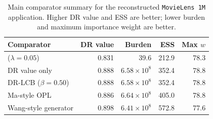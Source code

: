\begin{table}[!htbp]
\centering
\small
\begin{tabular}{lrrrr}
\toprule
Comparator & DR value & Burden & ESS & Max $w$ \\
\midrule
\CASP{} ($\lambda=0.05$) & 0.831 & 39.6 & 212.9 & 78.3 \\
DR value only & 0.888 & $6.58\times 10^8$ & 352.4 & 78.8 \\
DR-LCB ($\beta=0.50$) & 0.888 & $6.58\times 10^8$ & 352.4 & 78.8 \\
Ma-style OPL & 0.886 & $6.64\times 10^8$ & 405.0 & 78.8 \\
Wang-style generator & 0.898 & $6.41\times 10^8$ & 572.8 & 77.6 \\
\bottomrule
\end{tabular}
\caption{Main comparator summary for the reconstructed \texttt{MovieLens 1M} application. Higher DR value and ESS are better; lower burden and maximum importance weight are better.}
\label{tab:mlappmain}
\end{table}
